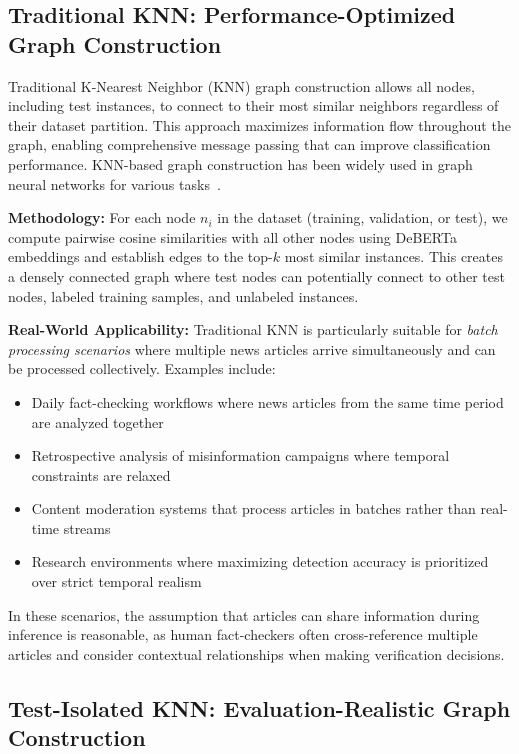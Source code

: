 \subsection{Traditional KNN: Performance-Optimized Graph Construction}

Traditional K-Nearest Neighbor (KNN) graph construction allows all nodes, including test instances, to connect to their most similar neighbors regardless of their dataset partition. This approach maximizes information flow throughout the graph, enabling comprehensive message passing that can improve classification performance. KNN-based graph construction has been widely used in graph neural networks for various tasks~\cite{kipf2017semi, hamilton2017inductive}.

\textbf{Methodology:} For each node $n_i$ in the dataset (training, validation, or test), we compute pairwise cosine similarities with all other nodes using DeBERTa embeddings and establish edges to the top-$k$ most similar instances. This creates a densely connected graph where test nodes can potentially connect to other test nodes, labeled training samples, and unlabeled instances.

\textbf{Real-World Applicability:} Traditional KNN is particularly suitable for \emph{batch processing scenarios} where multiple news articles arrive simultaneously and can be processed collectively. Examples include:
\begin{itemize}
    \item Daily fact-checking workflows where news articles from the same time period are analyzed together
    \item Retrospective analysis of misinformation campaigns where temporal constraints are relaxed
    \item Content moderation systems that process articles in batches rather than real-time streams
    \item Research environments where maximizing detection accuracy is prioritized over strict temporal realism
\end{itemize}

In these scenarios, the assumption that articles can share information during inference is reasonable, as human fact-checkers often cross-reference multiple articles and consider contextual relationships when making verification decisions.

\subsection{Test-Isolated KNN: Evaluation-Realistic Graph Construction}

